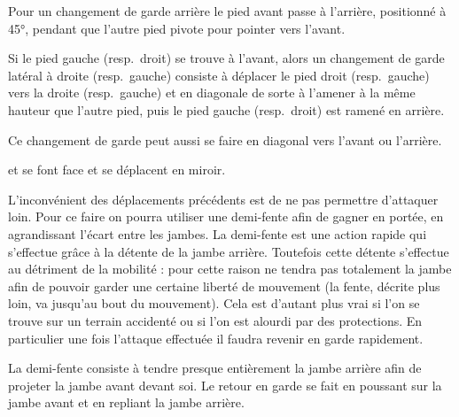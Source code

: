 \begin{definition}

	Pour un changement de garde arrière le pied avant passe à l'arrière, positionné à 45°, pendant que l'autre pied pivote pour pointer vers l'avant.
\end{definition}


\begin{definition}

	Si le pied gauche (resp.\ droit) se trouve à l'avant, alors un changement de garde latéral à droite (resp.\ gauche) consiste à déplacer le pied droit (resp.\ gauche) vers la droite (resp.\ gauche) et en diagonale de sorte à l'amener à la même hauteur que l'autre pied, puis le pied gauche (resp.\ droit) est ramené en arrière.
\end{definition}


Ce changement de garde peut aussi se faire en diagonal vers l'avant ou l'arrière.


\begin{exercice}
	\label{ex:general:miroir}
	


	\A et \D se font face et se déplacent en miroir.
\end{exercice}


L'inconvénient des déplacements précédents est de ne pas permettre d'attaquer loin.
Pour ce faire on pourra utiliser une demi-fente afin de gagner en portée, en agrandissant l'écart entre les jambes.
La demi-fente est une action rapide qui s'effectue grâce à la détente de la jambe arrière.
Toutefois cette détente s'effectue au détriment de la mobilité : pour cette raison ne tendra pas totalement la jambe afin de pouvoir garder une certaine liberté de mouvement (la fente, décrite plus loin, va jusqu'au bout du mouvement).
Cela est d'autant plus vrai si l'on se trouve sur un terrain accidenté ou si l'on est alourdi par des protections.
En particulier une fois l'attaque effectuée il faudra revenir en garde rapidement.

\begin{definition}
	\label{dep:def:demi-fente}

	La demi-fente consiste à tendre presque entièrement la jambe arrière afin de projeter la jambe avant devant soi.
	Le retour en garde se fait en poussant sur la jambe avant et en repliant la jambe arrière.
\end{definition}


